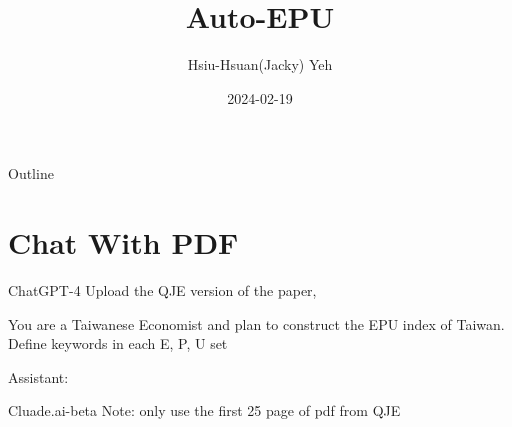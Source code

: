 \documentclass[12pt]{beamer}
\title{\huge{Auto-EPU}}
\author{Hsiu-Hsuan(Jacky) Yeh}
\date{2024-02-19}
\begin{document}
\maketitle


\begin{frame}{Outline}
\tableofcontents
\end{frame}


\section{Chat With PDF}


\begin{frame}{ChatGPT-4}
    Upload the QJE version of the paper, \cite{Baker2016}


You are a Taiwanese Economist and plan to construct the EPU index of Taiwan.
Define keywords in each E, P, U set

Assistant:

\begin{table}[H]
\renewcommand\arraystretch{1.2}
\begin{adjustwidth}{-0.1cm}{}
\begin{center}
\setlength{\tabcolsep}{30pt}
{
    \fontsize{10}{10} \selectfont
    
}
\end{center}
\end{adjustwidth}
\end{table}
\end{frame}


\begin{frame}{Cluade.ai-beta}
Note: only use the first 25 page of pdf from QJE
\begin{table}[H]
\renewcommand\arraystretch{1.2}
\begin{adjustwidth}{-0.1cm}{}
\begin{center}
\setlength{\tabcolsep}{30pt}
{
    \fontsize{10}{10} \selectfont
    
}
\end{center}
\end{adjustwidth}
\end{table}
\end{frame}
\end{document}
